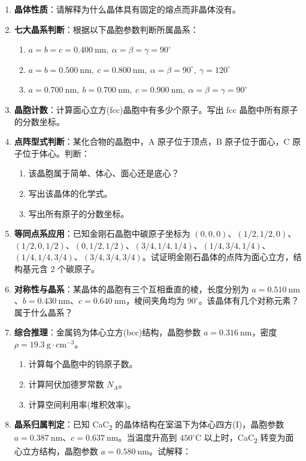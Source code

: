 \documentclass[a4paper,11pt]{ctexart}
\providecommand{\tightlist}{\setlength{\itemsep}{0pt}\setlength{\parskip}{0pt}}
\newcommand{\箭}{\ensuremath{\rightarrow}}
\newcommand{\左箭}{\ensuremath{\leftarrow}}
\newcommand{\上箭}{\ensuremath{\uparrow}}
\newcommand{\下箭}{\ensuremath{\downarrow}}
\newcommand{\衡}{\ensuremath{\rightleftharpoons}}
\newcommand{\双箭}{\ensuremath{\leftrightarrow}}
\newcommand{\约等于}{\ensuremath{\approx}}
\newcommand{\小于等于}{\ensuremath{\leq}}
\newcommand{\大于等于}{\ensuremath{\geq}}
\newcommand{\不等于}{\ensuremath{\neq}}
\newcommand{\西格马}{\ensuremath{\sigma}}
\newcommand{\派}{\ensuremath{\pi}}
\begin{document}
\begin{enumerate}
\def\labelenumi{\arabic{enumi}.}
\item
  \textbf{晶体性质}：请解释为什么晶体具有固定的熔点而非晶体没有。
\item
  \textbf{七大晶系判断}：根据以下晶胞参数判断所属晶系：

  \begin{enumerate}
  \def\labelenumii{(\arabic{enumii})}
  \tightlist
  \item
    \(a = b = c = 0.400\ \mathrm{nm},\ \alpha = \beta = \gamma = 90^\circ\)
  \item
    \(a = b = 0.500\ \mathrm{nm},\ c = 0.800\ \mathrm{nm},\ \alpha = \beta = 90^\circ,\ \gamma = 120^\circ\)
  \item
    \(a = 0.700\ \mathrm{nm},\ b = 0.700\ \mathrm{nm},\ c = 0.900\ \mathrm{nm},\ \alpha = \beta = \gamma = 90^\circ\)
  \end{enumerate}
\item
  \textbf{晶胞计数}：计算面心立方(fcc)晶胞中有多少个原子。写出 fcc 晶胞中所有原子的分数坐标。
\item
  \textbf{点阵型式判断}：某化合物的晶胞中，A 原子位于顶点，B 原子位于面心，C 原子位于体心。判断：

  \begin{enumerate}
  \def\labelenumii{(\arabic{enumii})}
  \tightlist
  \item
    该晶胞属于简单、体心、面心还是底心？
  \item
    写出该晶体的化学式。
  \item
    写出所有原子的分数坐标。
  \end{enumerate}
\item
  \textbf{等同点系应用}：已知金刚石晶胞中碳原子坐标为 \((0, 0, 0)\)、\((1/2, 1/2, 0)\)、\((1/2, 0, 1/2)\)、\((0, 1/2, 1/2)\)、\((3/4, 1/4, 1/4)\)、\((1/4, 3/4, 1/4)\)、\((1/4, 1/4, 3/4)\)、\((3/4, 3/4, 3/4)\)。试证明金刚石晶体的点阵为面心立方，结构基元含 2 个碳原子。
\item
  \textbf{对称性与晶系}：某晶体的晶胞有三个互相垂直的棱，长度分别为 \(a = 0.510\ \mathrm{nm}\)、\(b = 0.430\ \mathrm{nm}\)、\(c = 0.640\ \mathrm{nm}\)，棱间夹角均为 \(90^\circ\)。该晶体有几个对称元素？属于什么晶系？
\item
  \textbf{综合推理}：金属钨为体心立方(bcc)结构，晶胞参数 \(a = 0.316\ \mathrm{nm}\)，密度 \(\rho = 19.3\ \mathrm{g\cdot cm^{-3}}\)。

  \begin{enumerate}
  \def\labelenumii{(\arabic{enumii})}
  \tightlist
  \item
    计算每个晶胞中的钨原子数。
  \item
    计算阿伏加德罗常数 \(N_A\)。
  \item
    计算空间利用率(堆积效率)。
  \end{enumerate}
\item
  \textbf{晶系归属判定}：已知 CaC\textsubscript{2} 的晶体结构在室温下为体心四方(I)，晶胞参数 \(a = 0.387\ \mathrm{nm}\)、\(c = 0.637\ \mathrm{nm}\)。当温度升高到 \(450^\circ\mathrm{C}\) 以上时，CaC\textsubscript{2} 转变为面心立方结构，晶胞参数 \(a = 0.580\ \mathrm{nm}\)。试解释：


\end{enumerate}
\end{document}

